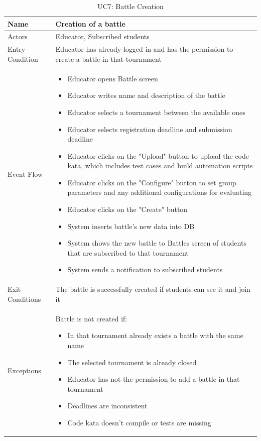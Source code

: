 \begin{enumerate}
   \begin{table}[H]
       \centering
       \begin{tabular}{|l|m{11cm}|}
        \hline
            Name & Creation of a battle\\
        \hline
            Actors & Educator, Subscribed students\\
        \hline
            Entry Condition & Educator has already logged in and has the permission to create a battle in that tournament\\
        \hline
            Event Flow & 
            \begin{itemize}
                \item Educator opens Battle screen
                \item Educator writes name and description of the battle
                \item Educator selects a tournament between the available ones
                \item Educator selects registration deadline and submission deadline 
                \item Educator clicks on the "Upload" button to upload the code kata, which includes test cases and build automation scripts
                \item Educator clicks on the "Configure" button to set group parameters and any additional configurations for evaluating
                \item Educator clicks on the "Create" button
                \item System inserts battle's new data into DB
                \item System shows the new battle to Battles screen of students that are subscribed to that tournament 
                \item System sends a notification to subscribed students
            \end{itemize}\\
        \hline
            Exit Conditions & The battle is successfully created if students can see it and join it\\
        \hline
            Exceptions & Battle is not created if: 
            \begin{itemize}
                \item In that tournament already exists a battle with the same name
                \item The selected tournament is already closed
                \item Educator has not the permission to add a battle in that tournament
                \item Deadlines are inconsistent
                \item Code kata doesn't compile or tests are missing
            \end{itemize}\\
        \hline
       \end{tabular}
       \caption{UC7: Battle Creation}
       \label{tab:uc7}
   \end{table}


\end{enumerate}
